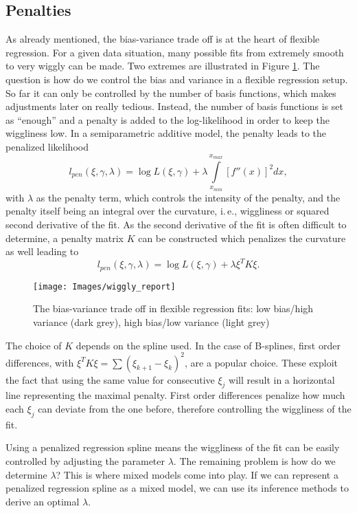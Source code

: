\documentclass[12pt]{article}
\begin{document}
\subsection{Penalties}\label{prs}

As already mentioned, the bias-variance trade off is at the heart of flexible regression. For a given data situation, many possible fits from extremely smooth to very wiggly can be made. Two extremes are illustrated in Figure \ref{wiggly}. The question is how do we control the bias and variance in a flexible regression setup. So far it can only be controlled by the number of basis functions, which makes adjustments later on really tedious. Instead, the number of basis functions is set as ``enough'' and a penalty is added to the log-likelihood in order to keep the wiggliness low. In a semiparametric additive model, the penalty leads to the penalized likelihood  
$$l_{pen}(\xi,\gamma, \lambda) =  \log L(\xi, \gamma) + \lambda \int\limits_{x_{min}}^{x_{max}} \left[ f''(x)\right]^2dx,$$
 with $\lambda$ as the penalty term, which controls the intensity of the penalty, and the penalty itself being an integral over the curvature, i.\,e., wiggliness or squared second derivative of the fit. As the second derivative of the fit is often difficult to determine, a penalty matrix $K$ can be constructed which penalizes the curvature as well leading to 
$$l_{pen}(\xi,\gamma, \lambda) = \log L(\xi, \gamma) + \lambda \xi^T K \xi.$$
\begin{figure}[b]
\begin{center}
\vspace{2em}
\texttt{[image: Images/wiggly\_report]}
\end{center}
\vspace{-2em}
\caption[caption]{The bias-variance trade off in flexible regression fits: low bias/high variance (dark grey), high bias/low variance (light grey)}\label{wiggly}
\end{figure}



The choice of $K$ depends on the spline used. In the case of B-splines, first order differences, with $\xi^TK\xi = \sum(\xi_{k+1} - \xi_{k})^2$, are a popular choice. These exploit the fact that using the same value for consecutive $\xi_j$ will result in a horizontal line representing the maximal penalty. First order differences penalize how much each $\xi_j$ can deviate from the one before, therefore controlling the wiggliness of the fit.


Using a penalized regression spline means the wiggliness of the fit can be easily controlled by adjusting the parameter $\lambda$. The remaining problem is how do we determine $\lambda$? This is where mixed models come into play. If we can represent a penalized regression spline as a mixed model, we can use its inference methods to derive an optimal $\lambda$.
\end{document}
